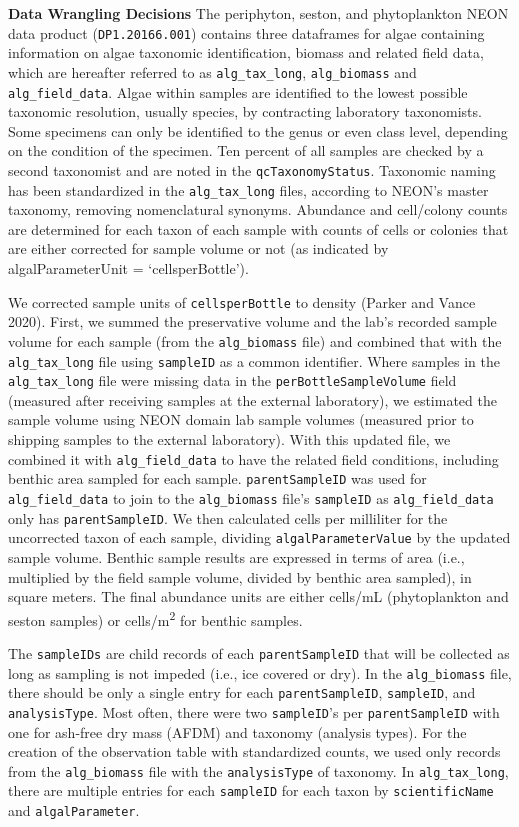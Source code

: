 \documentclass[
  12pt,
]{article}
\begin{document}
\textbf{Data Wrangling Decisions} The periphyton, seston, and phytoplankton NEON data product (\texttt{DP1.20166.001}) contains three dataframes for algae containing information on algae taxonomic identification, biomass and related field data, which are hereafter referred to as \texttt{alg\_tax\_long}, \texttt{alg\_biomass} and \texttt{alg\_field\_data}. Algae within samples are identified to the lowest possible taxonomic resolution, usually species, by contracting laboratory taxonomists. Some specimens can only be identified to the genus or even class level, depending on the condition of the specimen. Ten percent of all samples are checked by a second taxonomist and are noted in the \texttt{qcTaxonomyStatus}. Taxonomic naming has been standardized in the \texttt{alg\_tax\_long} files, according to NEON's master taxonomy, removing nomenclatural synonyms. Abundance and cell/colony counts are determined for each taxon of each sample with counts of cells or colonies that are either corrected for sample volume or not (as indicated by algalParameterUnit = `cellsperBottle').

We corrected sample units of \texttt{cellsperBottle} to density (Parker and Vance 2020). First, we summed the preservative volume and the lab's recorded sample volume for each sample (from the \texttt{alg\_biomass} file) and combined that with the \texttt{alg\_tax\_long} file using \texttt{sampleID} as a common identifier. Where samples in the \texttt{alg\_tax\_long} file were missing data in the \texttt{perBottleSampleVolume} field (measured after receiving samples at the external laboratory), we estimated the sample volume using NEON domain lab sample volumes (measured prior to shipping samples to the external laboratory). With this updated file, we combined it with \texttt{alg\_field\_data} to have the related field conditions, including benthic area sampled for each sample. \texttt{parentSampleID} was used for \texttt{alg\_field\_data} to join to the \texttt{alg\_biomass} file's \texttt{sampleID} as \texttt{alg\_field\_data} only has \texttt{parentSampleID}. We then calculated cells per milliliter for the uncorrected taxon of each sample, dividing \texttt{algalParameterValue} by the updated sample volume. Benthic sample results are expressed in terms of area (i.e., multiplied by the field sample volume, divided by benthic area sampled), in square meters. The final abundance units are either cells/mL (phytoplankton and seston samples) or cells/m\textsuperscript{2} for benthic samples.

The \texttt{sampleIDs} are child records of each \texttt{parentSampleID} that will be collected as long as sampling is not impeded (i.e., ice covered or dry). In the \texttt{alg\_biomass} file, there should be only a single entry for each \texttt{parentSampleID}, \texttt{sampleID}, and \texttt{analysisType}. Most often, there were two \texttt{sampleID}'s per \texttt{parentSampleID} with one for ash-free dry mass (AFDM) and taxonomy (analysis types). For the creation of the observation table with standardized counts, we used only records from the \texttt{alg\_biomass} file with the \texttt{analysisType} of taxonomy. In \texttt{alg\_tax\_long}, there are multiple entries for each \texttt{sampleID} for each taxon by \texttt{scientificName} and \texttt{algalParameter}.
\end{document}
